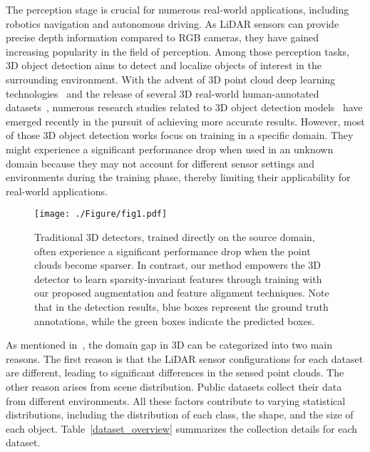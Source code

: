 \label{sec:intro}

The perception stage is crucial for numerous real-world applications, including robotics navigation and autonomous driving. As LiDAR sensors can provide precise depth information compared to RGB cameras, they have gained increasing popularity in the field of perception. Among those perception tasks, 3D object detection aims to detect and localize objects of interest in the surrounding environment. With the advent of 3D point cloud deep learning technologies~\cite{qi2017pointnet, qi2017pointnet++} and the release of several 3D real-world human-annotated datasets~\cite{geiger2012we, caesar2020nuscenes, sun2020scalability}, numerous research studies related to 3D object detection models~\cite{zhou2018voxelnet, yan2018second, yang2018pixor, lang2019pointpillars, shi2019pointrcnn, shi2020pv, shi2020points, shi2020point, yin2021center, deng2021voxel, shi2023pv} have emerged recently in the pursuit of achieving more accurate results. However, most of those 3D object detection works focus on training in a specific domain. They might experience a significant performance drop when used in an unknown domain because they may not account for different sensor settings and environments during the training phase, thereby limiting their applicability for real-world applications.

\begin{figure}[t!]
\centering
\texttt{[image: ./Figure/fig1.pdf]}
\caption{Traditional 3D detectors, trained directly on the source domain, often experience a significant performance drop when the point clouds become sparser. In contrast, our method empowers the 3D detector to learn sparsity-invariant features through training with our proposed augmentation and feature alignment techniques. Note that in the detection results, blue boxes represent the ground truth annotations, while the green boxes indicate the predicted boxes.
}

\vspace{-.5cm}
\label{fig1}
\end{figure}

As mentioned in~\cite{wang2020train}, the domain gap in 3D can be categorized into two main reasons. The first reason is that the LiDAR sensor configurations for each dataset are different, leading to significant differences in the sensed point clouds. The other reason arises from scene distribution. Public datasets collect their data from different environments. All these factors contribute to varying statistical distributions, including the distribution of each class, the shape, and the size of each object. Table~\ref{dataset_overview} summarizes the collection details for each dataset.

